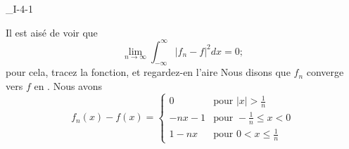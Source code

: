 

\begin{corrige}{_I-4-1}

Il est aisé de voir que
\begin{equation}
	\lim_{n\to\infty}\int_{-\infty}^{\infty}| f_n-f |^2dx=0;
\end{equation}
pour cela, tracez la fonction, et regardez-en l'aire 
Nous disons que $f_n$ converge vers $f$ en . Nous avons
\begin{equation}
	f_n(x)-f(x)=
\begin{cases}
	0	&	\text{pour }| x |>\frac{1}{ n }\\
	-nx-1	&	 \text{pour }-\frac{ 1 }{ n }\leq x<0\\
	1-nx	&	 \text{pour }0<x\leq\frac{1}{ n }
\end{cases}
\end{equation}
%

\end{corrige}
